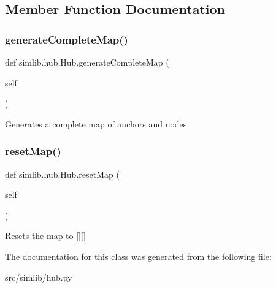 \subsection{Member Function Documentation}
\mbox{\label{classsimlib_1_1hub_1_1_hub_ad30ddbad3c34c11f7a392217578e39ad}} 
\subsubsection{\texorpdfstring{generate\+Complete\+Map()}{generateCompleteMap()}}
{\footnotesize\ttfamily def simlib.\+hub.\+Hub.\+generate\+Complete\+Map (\begin{DoxyParamCaption}\item[{}]{self }\end{DoxyParamCaption})}

\begin{DoxyVerb}Generates a complete map of anchors and nodes
\end{DoxyVerb}
 \mbox{\label{classsimlib_1_1hub_1_1_hub_acce9179de32abdcd091534e2d00b9156}} 
\subsubsection{\texorpdfstring{reset\+Map()}{resetMap()}}
{\footnotesize\ttfamily def simlib.\+hub.\+Hub.\+reset\+Map (\begin{DoxyParamCaption}\item[{}]{self }\end{DoxyParamCaption})}

\begin{DoxyVerb}Resets the map to [][] \end{DoxyVerb}
 

The documentation for this class was generated from the following file\+:\begin{DoxyCompactItemize}
\item 
src/simlib/hub.\+py\end{DoxyCompactItemize}
